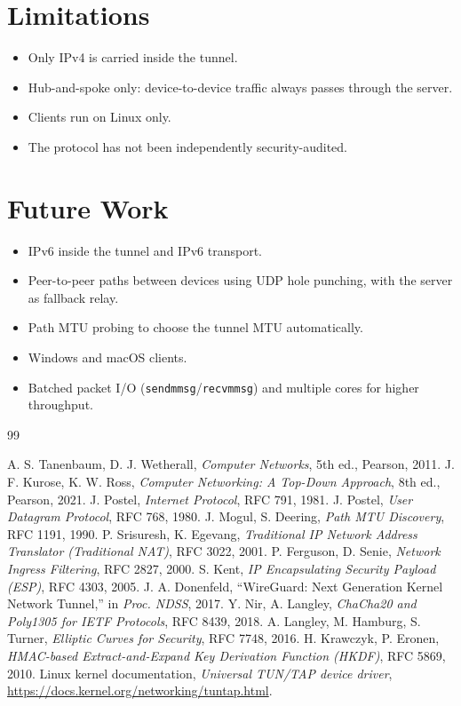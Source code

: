 \documentclass[12pt,a4paper]{report}
\begin{document}
\section{Limitations}
\begin{itemize}
  \item Only IPv4 is carried inside the tunnel.
  \item Hub-and-spoke only: device-to-device traffic always passes through the server.
  \item Clients run on Linux only.
  \item The protocol has not been independently security-audited.
\end{itemize}

\section{Future Work}
\begin{itemize}
  \item IPv6 inside the tunnel and IPv6 transport.
  \item Peer-to-peer paths between devices using UDP hole punching, with the server as fallback relay.
  \item Path MTU probing to choose the tunnel MTU automatically.
  \item Windows and macOS clients.
  \item Batched packet I/O (\texttt{sendmmsg}/\texttt{recvmmsg}) and multiple cores for higher throughput.
\end{itemize}

\renewcommand{\bibname}{References}
\begin{thebibliography}{99}
 A. S. Tanenbaum, D. J. Wetherall, \emph{Computer Networks}, 5th ed., Pearson, 2011.
 J. F. Kurose, K. W. Ross, \emph{Computer Networking: A Top-Down Approach}, 8th ed., Pearson, 2021.
 J. Postel, \emph{Internet Protocol}, RFC 791, 1981.
 J. Postel, \emph{User Datagram Protocol}, RFC 768, 1980.
 J. Mogul, S. Deering, \emph{Path MTU Discovery}, RFC 1191, 1990.
 P. Srisuresh, K. Egevang, \emph{Traditional IP Network Address Translator (Traditional NAT)}, RFC 3022, 2001.
 P. Ferguson, D. Senie, \emph{Network Ingress Filtering}, RFC 2827, 2000.
 S. Kent, \emph{IP Encapsulating Security Payload (ESP)}, RFC 4303, 2005.
 J. A. Donenfeld, ``WireGuard: Next Generation Kernel Network Tunnel,'' in \emph{Proc. NDSS}, 2017.
 Y. Nir, A. Langley, \emph{ChaCha20 and Poly1305 for IETF Protocols}, RFC 8439, 2018.
 A. Langley, M. Hamburg, S. Turner, \emph{Elliptic Curves for Security}, RFC 7748, 2016.
 H. Krawczyk, P. Eronen, \emph{HMAC-based Extract-and-Expand Key Derivation Function (HKDF)}, RFC 5869, 2010.
 Linux kernel documentation, \emph{Universal TUN/TAP device driver}, \url{https://docs.kernel.org/networking/tuntap.html}.
\end{thebibliography}
\end{document}
